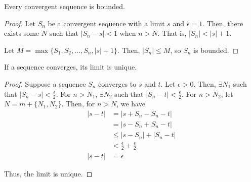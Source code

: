 \begin{theorem}{}{}
    Every convergent sequence is bounded.
\end{theorem}
\begin{proof}
    Let $S_n$ be a convergent sequence with a limit $s$ and $\epsilon = 1$. Then, there exists some $N$ such that $|S_n - s| < 1$ when $n > N$. That is, $|S_n| < |s| + 1$.

    Let $M = \max\{S_1, S_2, \ldots, S_n, |s| + 1\}$. Then, $|S_n| \leq M$, so $S_n$ is bounded.
\end{proof}

\begin{theorem}{}{}
    If a sequence converges, its limit is unique.
\end{theorem}
\begin{proof}
    Suppose a sequence $S_n$ converges to $s$ and $t$. Let $\epsilon > 0$. Then, $\exists N_1$ such that $|S_n - s| < \frac{\epsilon}{2}$. For $n > N_1$, $\exists N_2$ such that $|S_n - t| < \frac{\epsilon}{2}$. For $n > N_2$, let $N = m + \{N_1, N_2\}$. Then, for $n > N$, we have
    \begin{align*}
        |s - t| &= |s + S_n - S_n - t| \\
        &= |s - S_n + S_n - t| \\
        &\leq |s - S_n| + |S_n - t| \\
        &< \frac{\epsilon}{2} + \frac{\epsilon}{2} \\
        |s - t| &= \epsilon
    \end{align*}

    Thus, the limit is unique.
\end{proof}